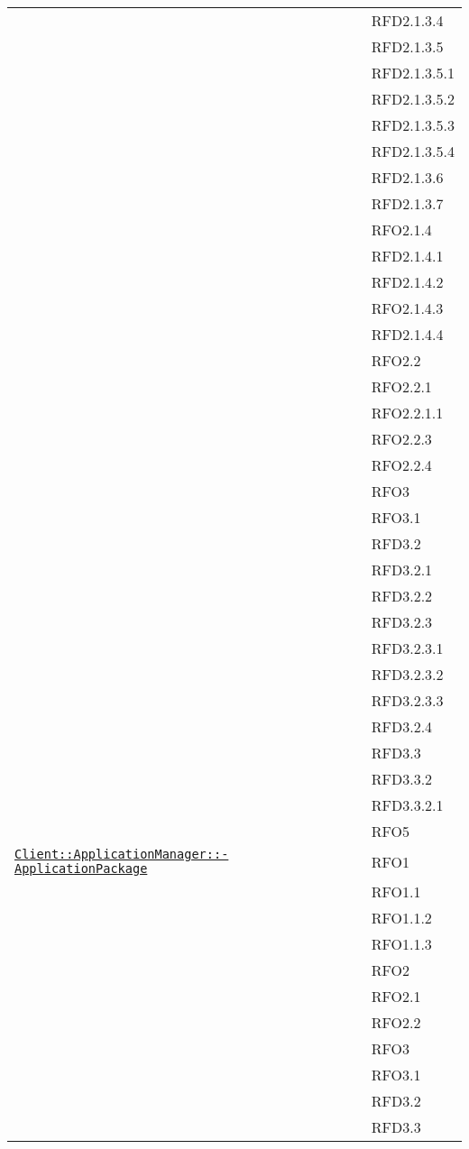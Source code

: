 \begin{longtable}{|>{\centering}m{10cm}|m{3cm}<{\centering}|}
& RFD2.1.3.4\\
& RFD2.1.3.5\\
& RFD2.1.3.5.1\\
& RFD2.1.3.5.2\\
& RFD2.1.3.5.3\\
& RFD2.1.3.5.4\\
& RFD2.1.3.6\\
& RFD2.1.3.7\\
& RFO2.1.4\\
& RFD2.1.4.1\\
& RFD2.1.4.2\\
& RFO2.1.4.3\\
& RFD2.1.4.4\\
& RFO2.2\\
& RFO2.2.1\\
& RFO2.2.1.1\\
& RFO2.2.3\\
& RFO2.2.4\\
& RFO3\\
& RFO3.1\\
& RFD3.2\\
& RFD3.2.1\\
& RFD3.2.2\\
& RFD3.2.3\\
& RFD3.2.3.1\\
& RFD3.2.3.2\\
& RFD3.2.3.3\\
& RFD3.2.4\\
& RFD3.3\\
& RFD3.3.2\\
& RFD3.3.2.1\\
& RFO5\\ \hline

\hyperref[Client::ApplicationManager::ApplicationPackage]{\texttt{Client::ApplicationManager::-\linebreak ApplicationPackage}} & RFO1\\
& RFO1.1\\
& RFO1.1.2\\
& RFO1.1.3\\
& RFO2\\
& RFO2.1\\
& RFO2.2\\
& RFO3\\
& RFO3.1\\
& RFD3.2\\
& RFD3.3\\ \hline


\end{longtable}
